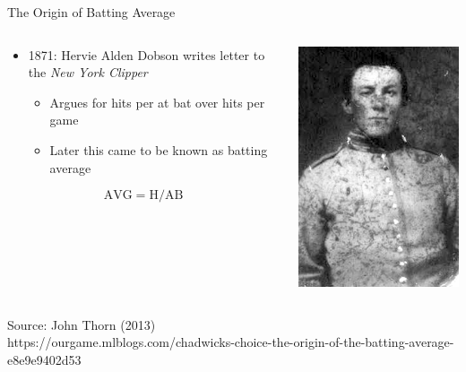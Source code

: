 \documentclass[handout]{beamer}
\begin{document}
\begin{frame}{The Origin of Batting Average}
\begin{columns}
  \end{columns}
  \pause
  \begin{columns}
    \begin{column}{0.8\textwidth}
      \begin{itemize}
        \item 1871: Hervie Alden Dobson writes letter to the {\it New York Clipper}
        \begin{itemize}
          \item Argues for hits per at bat over hits per game
          \item Later this came to be known as batting average
        \end{itemize}
      \end{itemize}
      $$
        \mbox{AVG} = \mbox{H} / \mbox{AB}
      $$
    \end{column}
    \begin{column}{0.2\textwidth}
      \includegraphics[width = \textwidth]{images/dobson.jpeg}
    \end{column}
  \end{columns}
  \vfill
  \hfill\color{ricegray}\tiny Source: John Thorn (2013)\\
  \hfill https://ourgame.mlblogs.com/chadwicks-choice-the-origin-of-the-batting-average-e8e9e9402d53
\end{frame}
\end{document}
